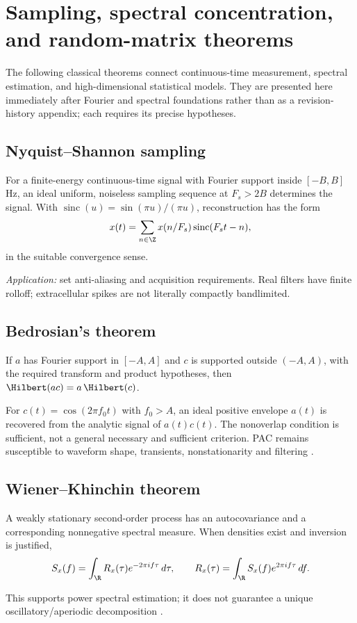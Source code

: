 \chapter[Classical sampling and random matrices]{Sampling, spectral concentration, and random-matrix theorems}
\label{ch:classical-sampling}
The following classical theorems connect continuous-time measurement,
spectral estimation, and high-dimensional statistical models. They are
presented here immediately after Fourier and spectral foundations rather
than as a revision-history appendix; each requires its precise hypotheses.

\section{Nyquist--Shannon sampling}
\begin{theorem}
For a finite-energy continuous-time signal with Fourier support
inside $[-B,B]$ Hz, an ideal uniform, noiseless sampling sequence at
$F_s>2B$ determines the signal. With
$\operatorname{sinc}(u)=\sin(\pi u)/(\pi u)$, reconstruction has the form
\[
x(t)=\sum_{n\in\Z}x(n/F_s)\operatorname{sinc}(F_st-n),
\]
in the suitable convergence sense.
\end{theorem}
\emph{Application:} set anti-aliasing and acquisition requirements.
Real filters have finite rolloff; extracellular spikes are not
literally compactly bandlimited.

\section{Bedrosian's theorem}
\begin{theorem}
If $a$ has Fourier support in $[-A,A]$ and $c$ is supported
outside $(-A,A)$, with the required transform and product
hypotheses, then $\Hilbert(ac)=a\,\Hilbert(c)$.
\end{theorem}
For $c(t)=\cos(2\pi f_0t)$ with $f_0>A$, an ideal positive envelope
$a(t)$ is recovered from the analytic signal of $a(t)c(t)$.
The nonoverlap condition is sufficient, not a general necessary and
sufficient criterion. PAC remains susceptible to waveform shape,
transients, nonstationarity and filtering \cite{aru2015,cole2019}.

\section{Wiener--Khinchin theorem}
\begin{theorem}
A weakly stationary second-order process has an autocovariance and
a corresponding nonnegative spectral measure. When densities
exist and inversion is justified,
\[
S_x(f)=\int_{\R}R_x(\tau)e^{-2\pi if\tau}\,d\tau,\qquad
R_x(\tau)=\int_{\R}S_x(f)e^{2\pi if\tau}\,df.
\]
\end{theorem}
This supports power spectral estimation; it does not guarantee a unique
oscillatory/aperiodic decomposition \cite{donoghue2020,gerster2022}.

